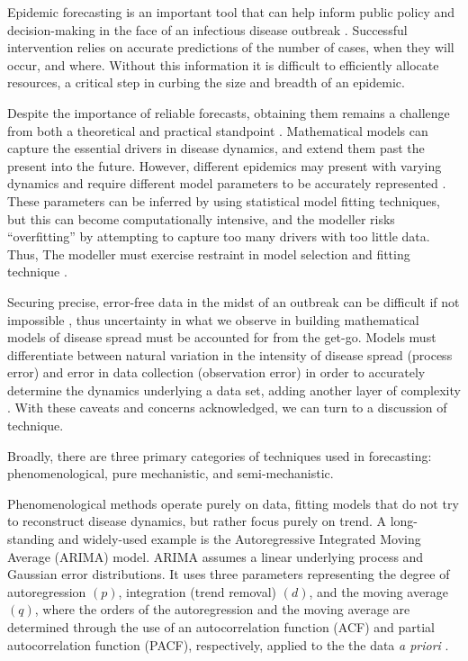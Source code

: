 
Epidemic forecasting is an important tool that can help inform public policy and decision-making in the face of an infectious disease outbreak \cite{Nsoesie2014}\cite{Chretien2014}\cite{Yang2014}. Successful intervention relies on accurate predictions of the number of cases, when they will occur, and where. Without this information it is difficult to efficiently allocate resources, a critical step in curbing the size and breadth of an epidemic.

Despite the importance of reliable forecasts, obtaining them remains a challenge from both a theoretical and practical standpoint \cite{Nsoesie2014}. Mathematical models can capture the essential drivers in disease dynamics, and extend them past the present into the future. However, different epidemics may present with varying dynamics and require different model parameters to be accurately represented \cite{Camacho2011}. These parameters can be inferred by using statistical model fitting techniques, but this can become computationally intensive, and the modeller risks ``overfitting'' by attempting to capture too many drivers with too little data. Thus, The modeller must exercise restraint in model selection and fitting technique \cite{Babyak2004}.

Securing precise, error-free data in the midst of an outbreak can be difficult if not impossible \cite{Shaman2014}, thus uncertainty in what we observe in building mathematical models of disease spread must be accounted for from the get-go. Models must differentiate between natural variation in the intensity of disease spread (process error) and error in data collection (observation error) in order to accurately determine the dynamics underlying a data set, adding another layer of complexity \cite{King2015}. With these caveats and concerns acknowledged, we can turn to a discussion of technique.

Broadly, there are three primary categories of techniques used in forecasting: phenomenological, pure mechanistic, and semi-mechanistic.

Phenomenological methods operate purely on data, fitting models that do not try to reconstruct disease dynamics, but rather focus purely on trend. A long-standing and widely-used example is the Autoregressive Integrated Moving Average (ARIMA) model. ARIMA assumes a linear underlying process and Gaussian error distributions. It uses three parameters representing the degree of autoregression $(p)$, integration (trend removal) $(d)$, and the moving average $(q)$, where the orders of the autoregression and the moving average are determined through the use of an autocorrelation function (ACF) and partial autocorrelation function (PACF), respectively, applied to the the data \textit{a priori} \cite{Zhang2013}.


